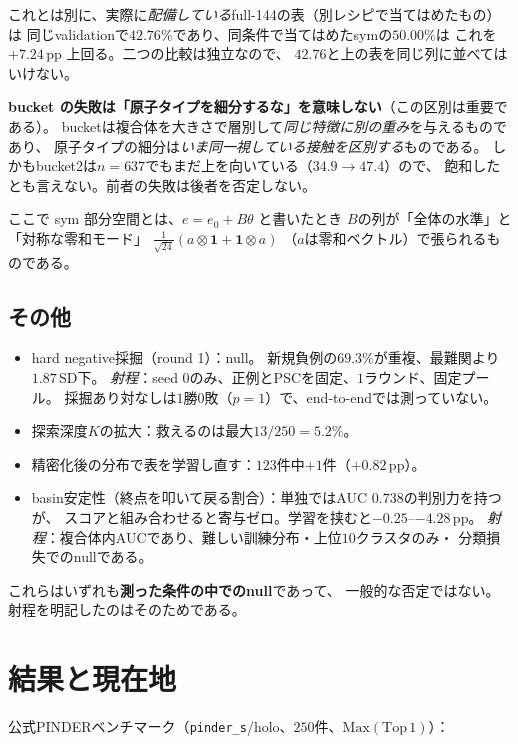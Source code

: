 \documentclass[11pt,a4paper]{article}
\begin{document}
これとは別に、実際に\emph{配備している}full-144の表（別レシピで当てはめたもの）は
同じvalidationで$42.76\%$であり、同条件で当てはめたsymの$50.00\%$は
これを$+7.24$\,pp 上回る。二つの比較は独立なので、
$42.76$と上の表を同じ列に並べてはいけない。

\textbf{bucket の失敗は「原子タイプを細分するな」を意味しない}（この区別は重要である）。
bucketは複合体を大きさで層別して\emph{同じ特徴に別の重み}を与えるものであり、
原子タイプの細分は\emph{いま同一視している接触を区別する}ものである。
しかもbucket2は$n = 637$でもまだ上を向いている（$34.9 \to 47.4$）ので、
飽和したとも言えない。前者の失敗は後者を否定しない。

ここで sym 部分空間とは、$e = e_0 + B\theta$ と書いたとき
$B$の列が「全体の水準」と「対称な零和モード」
$\frac{1}{\sqrt{24}}(a\otimes\mathbf{1} + \mathbf{1}\otimes a)$
（$a$は零和ベクトル）で張られるものである。

\subsection{その他}

\begin{itemize}
  \item hard negative採掘（round 1）：null。
        新規負例の$69.3\%$が重複、最難関より$1.87$\,SD下。
        \emph{射程}：seed $0$のみ、正例とPSCを固定、$1$ラウンド、固定プール。
        採掘あり対なしは$1$勝$0$敗（$p = 1$）で、end-to-endでは測っていない。
  \item 探索深度$K$の拡大：救えるのは最大$13/250 = 5.2\%$。
  \item 精密化後の分布で表を学習し直す：$123$件中$+1$件（$+0.82$\,pp）。
  \item basin安定性（終点を叩いて戻る割合）：単独ではAUC $0.738$の判別力を持つが、
        スコアと組み合わせると寄与ゼロ。学習を挟むと$-0.25$--$-4.28$\,pp。
        \emph{射程}：複合体内AUCであり、難しい訓練分布・上位$10$クラスタのみ・
        分類損失でのnullである。
\end{itemize}

これらはいずれも\textbf{測った条件の中でのnull}であって、
一般的な否定ではない。射程を明記したのはそのためである。

\section{結果と現在地}

公式PINDERベンチマーク（\texttt{pinder\_s}/holo、$250$件、$\mathrm{Max}(\mathrm{Top}\,1)$）：
\end{document}
